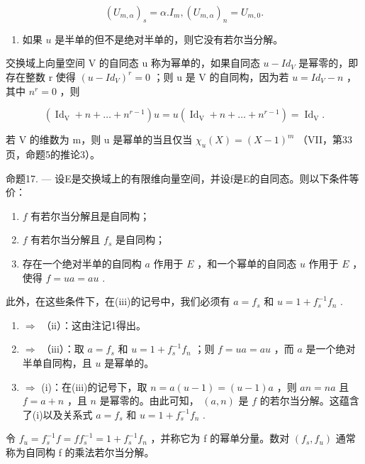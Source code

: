 \[
(U _ {m, \alpha}) _ {s} = \alpha . I _ {m}, (U _ {m, \alpha}) _ {n} = U _ {m, 0}.
\]

\begin{enumerate}
\def\labelenumi{\arabic{enumi})}
\setcounter{enumi}{3}
\tightlist
\item
  如果 \(u\) 是半单的但不是绝对半单的，则它没有若尔当分解。
\end{enumerate}

交换域上向量空间 V 的自同态 u 称为幂单的，如果自同态 \(u - Id_{V}\) 是幂零的，即存在整数 r 使得 \((u - Id_{V})^{r} = 0\) ；则 u 是 V 的自同构，因为若 \(u = Id_{V} - n\) ，其中 \(n^{r} = 0\) ，则

\[
\left(\operatorname{Id} _ {\mathrm{V}} + n + \dots + n ^ {r - 1}\right) u = u \left(\operatorname{Id} _ {\mathrm{V}} + n + \dots + n ^ {r - 1}\right) = \operatorname{Id} _ {\mathrm{V}}.
\]

若 V 的维数为 m，则 u 是幂单的当且仅当 \(\chi_{u}(X)=(X-1)^{m}\) （VII，第33页，命题5的推论3）。

命题17. --- 设E是交换域上的有限维向量空间，并设f是E的自同态。则以下条件等价：

\begin{enumerate}
\def\labelenumi{(\roman{enumi})}
\item
  \(f\) 有若尔当分解且是自同构；
\item
  \(f\) 有若尔当分解且 \(f_{s}\) 是自同构；
\item
  存在一个绝对半单的自同构 \(a\) 作用于 \(E\) ，和一个幂单的自同态 \(u\) 作用于 \(E\) ，使得 \(f = ua = au\) .
\end{enumerate}

此外，在这些条件下，在(iii)的记号中，我们必须有 \(a = f_{s}\) 和 \(u = 1 + f_{s}^{-1}f_{n}\) .

\begin{enumerate}
\def\labelenumi{(\roman{enumi})}
\item
  \(\Rightarrow\) （ii）：这由注记1得出。
\item
  \(\Rightarrow\) （iii）：取 \(a = f_{s}\) 和 \(u = 1 + f_{s}^{-1}f_{n}\) ；则 \(f = ua = au\) ，而 \(a\) 是一个绝对半单自同构，且 \(u\) 是幂单的。
\item
  \(\Rightarrow\) (i)：在(iii)的记号下，取 \(n = a(u - 1) = (u - 1)a\) ，则 \(an = na\) 且 \(f = a + n\) ，且 \(n\) 是幂零的。由此可知， \((a, n)\) 是 \(f\) 的若尔当分解。这蕴含了(i)以及关系式 \(a = f_s\) 和 \(u = 1 + f_s^{-1}f_n\) .
\end{enumerate}

令 \(f_{u}=f_{s}^{-1}f=ff_{s}^{-1}=1+f_{s}^{-1}f_{n}\) ，并称它为 f 的幂单分量。数对 \((f_{s},f_{u})\) 通常称为自同构 f 的乘法若尔当分解。


